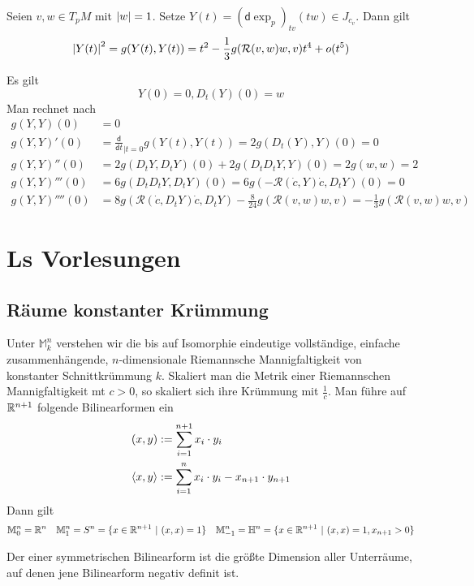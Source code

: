 \documentclass{book}
\renewcommand{\d}{\textsf{d}}
\renewcommand{\M}{\mathbb{M}}
\newcommand{\Rc}{\mathcal{R}}
\begin{document}
\Prop{}
Seien $v,w \in T_pM$ mit $\left|w\right| = 1$. Setze $Y(t) = (\d \exp_p)_{tv}(tw) \in J_{c_v}$. Dann gilt
\[ \bet{Y(t)}^2 = g(Y(t), Y(t)) = t^2 - \frac{1}{3} g(\Rc(v,w)w, v)t^4 + o(t^5) \]

\begin{Beweis}{}
Es gilt
\[ Y(0) = 0, D_t(Y)(0) = w \]
Man rechnet nach
\begin{align*}
	g(Y,Y)(0)     & = 0                                                                    \\
	g(Y,Y)'(0)    & = \frac{\d}{\d t}_{|t = 0} g(Y(t), Y(t)) = 2g(D_t(Y),Y) (0) = 0        \\
	g(Y,Y)''(0)   & = 2g(D_tY, D_tY)(0) + 2g(D_tD_tY,Y)(0) = 2g(w,w) = 2                   \\
	g(Y,Y)'''(0)  & = 6g(D_tD_tY, D_tY)(0) = 6g(-\Rc(\dot{c}, Y) \dot{c}, D_t Y ) (0) = 0  \\
	g(Y,Y)''''(0) & = 8g(\Rc(\dot{c}, D_tY )\dot{c}, D_tY  ) - \frac{8}{24} g(\Rc(v,w)w,v) = - \frac{1}{3}g(\Rc(v,w)w,v)
\end{align*}
\end{Beweis}

\newpage
\chapter{Ls Vorlesungen}
\section{Räume konstanter Krümmung}
\Def{}
Unter $\M_k^n$ verstehen wir die bis auf Isomorphie eindeutige vollständige, einfache zusammenhängende, $n$-dimensionale Riemannsche Mannigfaltigkeit von konstanter Schnittkrümmung $k$.
\Bem{}
Skaliert man die Metrik einer Riemannschen Mannigfaltigkeit mt $c > 0$, so skaliert sich ihre Krümmung mit $\frac{1}{c}$.
\Bsp{}
Man führe auf $\mathbb{R}^{n+1}$ folgende Bilinearformen ein
\begin{align*}
(x,y) &:= \sum_{i = 1}^{n+1}x_i \cdot y_i\\
\left<x,y\right> &:= \sum_{i = 1}^{n}x_i \cdot y_i - x_{n+1} \cdot y_{n+1}\\
\end{align*}
Dann gilt
\begin{align*}
\M_0^n = \R^n && \M_1^n = S^n = \{x \in \R^{n+1} ~|~ (x,x) = 1\} && \M_{-1}^n = \H^n = \{ x \in \R^{n+1} ~|~ (x,x) = 1, x_{n+1} > 0 \} 
\end{align*}

\Def{}
Der  einer symmetrischen Bilinearform ist die größte Dimension aller Unterräume, auf denen jene Bilinearform negativ definit ist.
\end{document}
